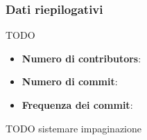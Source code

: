 \documentclass{book}
\begin{document}
\subsubsection{Dati riepilogativi} TODO
\begin{itemize}
    \item \textbf{Numero di contributors}:
    \item \textbf{Numero di commit}: 
    \item \textbf{Frequenza dei commit}:
\end{itemize}

TODO sistemare impaginazione

\clearpage
\end{document}
